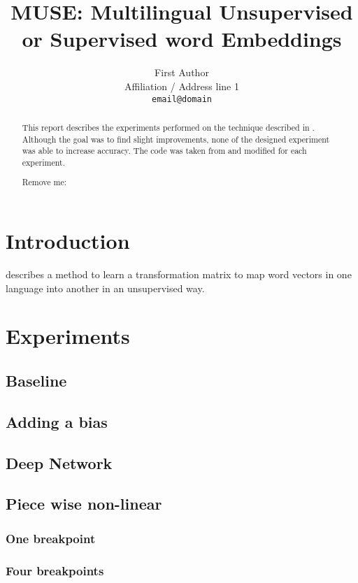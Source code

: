 \documentclass[11pt]{article}
\title{MUSE: Multilingual Unsupervised or Supervised word Embeddings}
\author{First Author \\
  Affiliation / Address line 1 \\
  {\tt email@domain}}
\date{}
\begin{document}
\maketitle
\begin{abstract}
This report describes the experiments performed on the technique described in \cite{conneau2017word}. Although the goal was to find slight improvements, none of the designed experiment was able to increase accuracy. The code was taken from \cite{muserepo} and modified for each experiment.

Remove me: \cite{lample2017unsupervised}

\end{abstract}

\section{Introduction}
\cite{conneau2017word} describes a method to learn a transformation matrix to map word vectors in one language into another in an unsupervised way.

\section{Experiments}

\subsection{Baseline}

\subsection{Adding a bias}

\subsection{Deep Network}

\subsection{Piece wise non-linear}

\subsubsection{One breakpoint}

\subsubsection{Four breakpoints}
\end{document}
